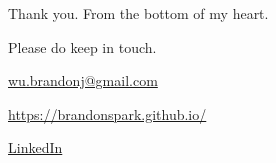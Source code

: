 \documentclass[aspectratio=169, handout]{beamer}
\begin{document}
\begin{frame}[plain]
	\begin{center}
    {\large
    Thank you. From the bottom of my heart.
    }

    \vspace{20pt}

    Please do keep in touch.

    \vspace{10pt}

    {\color{blue}\href{mailto://wu.brandonj@gmail.com}{wu.brandonj@gmail.com}}

    {\color{blue}\href{https://brandonspark.github.io/}{https://brandonspark.github.io/}}

    {\color{blue}\href{https://www.linkedin.com/in/brandon-wu-79935116b/}{LinkedIn}}

  \end{center}
\end{frame}
\end{document}

